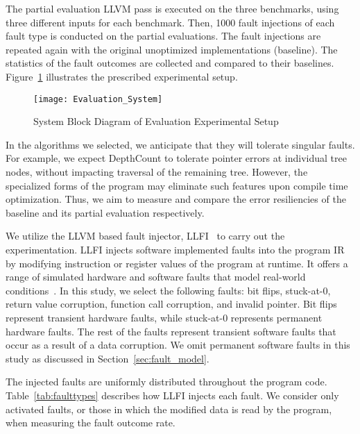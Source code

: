 The partial evaluation LLVM pass is executed on the three benchmarks, using three different inputs for each benchmark.
Then, 1000 fault injections of each fault type is conducted on the partial evaluations.
The fault injections are repeated again with the original unoptimized implementations (baseline).
The statistics of the fault outcomes are collected and compared to their baselines. 
Figure~\ref{fig:evaluation_sys} illustrates the prescribed experimental setup.

\begin{figure}[htbp]
  \centering
  \texttt{[image: Evaluation\_System]}
  \caption{System Block Diagram of Evaluation Experimental Setup}
  \label{fig:evaluation_sys}
\end{figure}

In the algorithms we selected, we anticipate that they will tolerate singular faults.
For example, we expect DepthCount to tolerate pointer errors at individual tree nodes, without impacting traversal of the remaining tree.
However, the specialized forms of the program may eliminate such features upon compile time optimization.
Thus, we aim to measure and compare the error resiliencies of the baseline and its partial evaluation respectively.

We utilize the LLVM based fault injector, LLFI~\cite{LLFI} to carry out the experimentation.
LLFI injects software implemented faults into the program IR by modifying instruction or register values of the program at runtime.
It offers a range of simulated hardware and software faults that model real-world conditions~\cite{V2005}.
In this study, we select the following faults: bit flips, stuck-at-0, return value corruption, function call corruption, and invalid pointer.
Bit flips represent transient hardware faults, while stuck-at-0 represents permanent hardware faults. 
The rest of the faults represent transient software faults that occur as a result of a data corruption.
We omit permanent software faults in this study as discussed in Section~\ref{sec:fault_model}.

The injected faults are uniformly distributed throughout the program code.
Table~\ref{tab:faulttypes} describes how LLFI injects each fault.
We consider only activated faults, or those in which the modified data is read by the program, when measuring the fault outcome rate.


